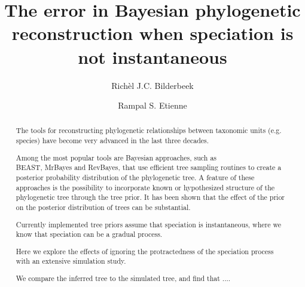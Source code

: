 \documentclass{article}
\title{The error in Bayesian phylogenetic reconstruction when speciation is not instantaneous}
\author[1]{Rich\`el J.C. Bilderbeek}
\author[1]{Rampal S. Etienne}
\affil[1]{Groningen Institute for Evolutionary Life Sciences, University of Groningen, Groningen, The Netherlands}
\begin{document}
\maketitle

\begin{abstract}



  The tools for reconstructing phylogenetic relationships between taxonomic 
  units (e.g. species) have become very advanced in the last three decades. 

  Among the most popular tools are Bayesian approaches, 
  such as \\ BEAST, MrBayes and RevBayes, 
  that use efficient tree sampling routines to create a posterior probability distribution 
  of the phylogenetic tree. 
  A feature of these approaches is the possibility to incorporate 
  known or hypothesized structure of the phylogenetic tree through the tree prior. 
  It has been shown that the effect of the prior on the posterior distribution 
  of trees can be substantial. 

  Currently implemented tree priors assume that speciation is instantaneous,
  where we know that speciation can be a gradual process.

  Here we explore the effects of ignoring 
  the protractedness of the speciation process with an extensive simulation study. 





  We compare the inferred tree to the simulated tree, and find that ....

\end{abstract}
\end{document}

